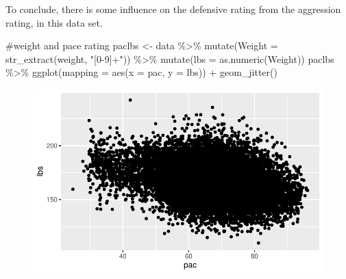 \documentclass[
  letterpaper,
  DIV=11,
  numbers=noendperiod]{scrartcl}
\newenvironment{Shaded}{\begin{snugshade}}{\end{snugshade}}
\newcommand{\AttributeTok}[1]{\textcolor[rgb]{0.40,0.45,0.13}{#1}}
\newcommand{\CommentTok}[1]{\textcolor[rgb]{0.37,0.37,0.37}{#1}}
\newcommand{\FunctionTok}[1]{\textcolor[rgb]{0.28,0.35,0.67}{#1}}
\newcommand{\NormalTok}[1]{\textcolor[rgb]{0.00,0.23,0.31}{#1}}
\newcommand{\OtherTok}[1]{\textcolor[rgb]{0.00,0.23,0.31}{#1}}
\newcommand{\SpecialCharTok}[1]{\textcolor[rgb]{0.37,0.37,0.37}{#1}}
\newcommand{\StringTok}[1]{\textcolor[rgb]{0.13,0.47,0.30}{#1}}
\begin{document}
To conclude, there is some influence on the defensive rating from the
aggression rating, in this data set.

\begin{Shaded}
\begin{Highlighting}[]
\CommentTok{\#weight and pace rating}
\NormalTok{paclbs }\OtherTok{\textless{}{-}}\NormalTok{ data }\SpecialCharTok{\%\textgreater{}\%} 
  \FunctionTok{mutate}\NormalTok{(}\StringTok{\textquotesingle{}Weight\textquotesingle{}} \OtherTok{=} \FunctionTok{str\_extract}\NormalTok{(weight, }\StringTok{"[0{-}9]+"}\NormalTok{)) }\SpecialCharTok{\%\textgreater{}\%} 
  \FunctionTok{mutate}\NormalTok{(}\StringTok{\textquotesingle{}lbs\textquotesingle{}} \OtherTok{=} \FunctionTok{as.numeric}\NormalTok{(Weight))}
\NormalTok{paclbs }\SpecialCharTok{\%\textgreater{}\%} 
  \FunctionTok{ggplot}\NormalTok{(}\AttributeTok{mapping =} \FunctionTok{aes}\NormalTok{(}\AttributeTok{x =}\NormalTok{ pac, }\AttributeTok{y =}\NormalTok{ lbs)) }\SpecialCharTok{+} 
  \FunctionTok{geom\_jitter}\NormalTok{()}
\end{Highlighting}
\end{Shaded}

\begin{figure}[H]

{\centering \includegraphics{FIFA21_files/figure-pdf/unnamed-chunk-14-1.pdf}

}

\end{figure}

\begin{Shaded}
\end{Shaded}
\end{document}
